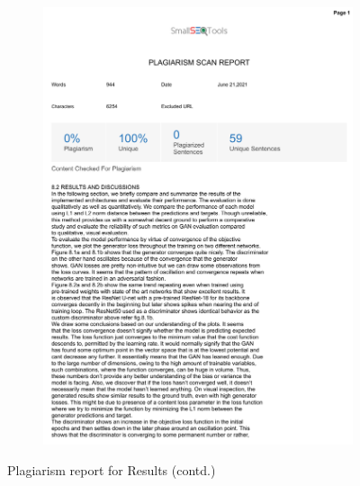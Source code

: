 \documentclass[oneside,a4paper,12pt]{report}
\begin{document}
\begin{appendices}
\begin{figure}
\begin{subfigure}[H]{\textwidth}
    	\includegraphics[scale=0.7, page=2]{plagiarism/results_1.pdf}
    \end{subfigure}
    \caption{Plagiarism report for Results (contd.)}
    \label{PlagiarismResults_1}
\end{figure}
\begin{figure}\ContinuedFloat
    \begin{subfigure}[H]{\textwidth}
    	\centering

\end{subfigure}
\end{figure}
\end{appendices}
\end{document}
